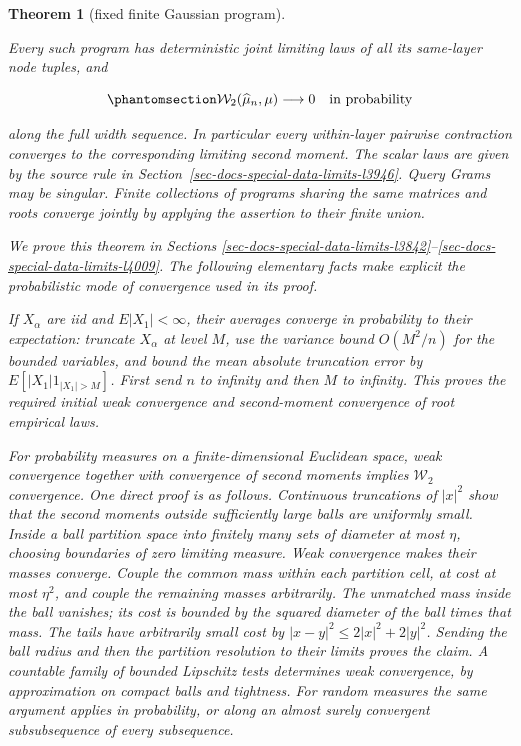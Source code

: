 \documentclass[
  11pt,
]{article}
\theoremstyle{definition}
\theoremstyle{plain}
\newtheorem{theorem}{Theorem}[section]
\theoremstyle{plain}
\theoremstyle{plain}
\theoremstyle{remark}
\begin{document}
\begin{theorem}[fixed finite Gaussian
program]\protect\hypertarget{thm-docs-special-data-limits-l3820}{}\label{thm-docs-special-data-limits-l3820}

Every such program has deterministic joint limiting laws of all its
same-layer node tuples, and

\begin{equation}\protect\phantomsection\label{eq-docs-special-data-limits-l3821}{
\mathcal W_2(\widehat\mu_n,\mu)\longrightarrow0
\quad\hbox{in probability}
}\end{equation}

along the full width sequence. In particular every within-layer pairwise
contraction converges to the corresponding limiting second moment. The
scalar laws are given by the source rule in
Section~\ref{sec-docs-special-data-limits-l3946}. Query Grams may be
singular. Finite collections of programs sharing the same matrices and
roots converge jointly by applying the assertion to their finite union.

We prove this theorem in Sections
\ref{sec-docs-special-data-limits-l3842}--\ref{sec-docs-special-data-limits-l4009}.
The following elementary facts make explicit the probabilistic mode of
convergence used in its proof.

If \(X_\alpha\) are iid and \(E|X_1|<\infty\), their averages converge
in probability to their expectation: truncate \(X_\alpha\) at level
\(M\), use the variance bound \(O(M^2/n)\) for the bounded variables,
and bound the mean absolute truncation error by \(E[|X_1|1_{|X_1|>M}]\).
First send \(n\) to infinity and then \(M\) to infinity. This proves the
required initial weak convergence and second-moment convergence of root
empirical laws.

For probability measures on a finite-dimensional Euclidean space, weak
convergence together with convergence of second moments implies
\(\mathcal W_2\) convergence. One direct proof is as follows. Continuous
truncations of \(|x|^2\) show that the second moments outside
sufficiently large balls are uniformly small. Inside a ball partition
space into finitely many sets of diameter at most \(\eta\), choosing
boundaries of zero limiting measure. Weak convergence makes their masses
converge. Couple the common mass within each partition cell, at cost at
most \(\eta^2\), and couple the remaining masses arbitrarily. The
unmatched mass inside the ball vanishes; its cost is bounded by the
squared diameter of the ball times that mass. The tails have arbitrarily
small cost by \(|x-y|^2\le2|x|^2+2|y|^2\). Sending the ball radius and
then the partition resolution to their limits proves the claim. A
countable family of bounded Lipschitz tests determines weak convergence,
by approximation on compact balls and tightness. For random measures the
same argument applies in probability, or along an almost surely
convergent subsubsequence of every subsequence.


\end{theorem}
\end{document}
